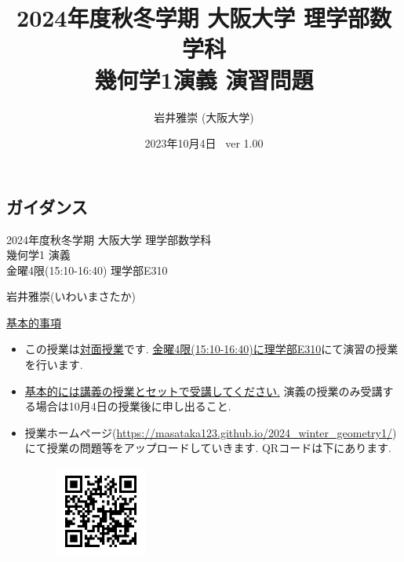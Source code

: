 \documentclass[dvipdfmx,a4paper,11pt]{article}
\title{2024年度秋冬学期 大阪大学 理学部数学科\\  幾何学1演義 演習問題}
\author{岩井雅崇 (大阪大学)}
\date{2023年10月4日 \, ver 1.00}
\theoremstyle{definition}
\begin{document}
\maketitle
\tableofcontents
\newpage

\begin{center}
\setcounter{section}{-1}
\section{ガイダンス}
\label{sec-guide}
\end{center}

\begin{center}
{\Large 2024年度秋冬学期 大阪大学 理学部数学科\\  幾何学1 演義} \\
金曜4限(15:10-16:40) 理学部E310
\end{center}
\begin{flushright}
 岩井雅崇(いわいまさたか) \\
\end{flushright}
{\Large \underline{基本的事項}}
\begin{itemize}
  \setlength{\parskip}{0cm} %
  \setlength{\itemsep}{0cm} %
\item この授業は\underline{対面授業}です. \underline{金曜4限(15:10-16:40)に理学部E310}にて演習の授業を行います.
\item \underline{基本的には講義の授業とセットで受講してください.} 演義の授業のみ受講する場合は10月4日の授業後に申し出ること. 
\item 授業ホームページ(\url{https://masataka123.github.io/2024_winter_geometry1/})にて授業の問題等をアップロードしていきます. 
QRコードは下にあります.
\begin{figure}[htbp]
\begin{center}
 \includegraphics[height=30mm, width=30mm]{stokes.png}
\end{center}
\end{figure}
\end{itemize}

\end{document}
